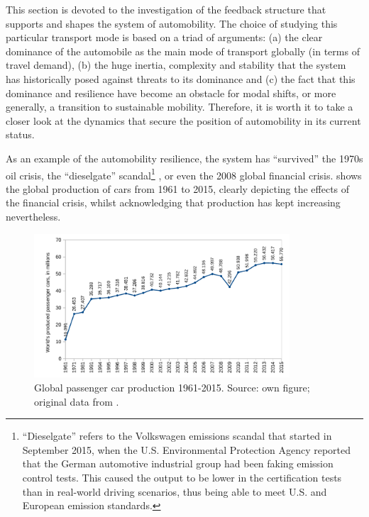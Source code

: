 This section is devoted to the investigation of the feedback structure that supports and shapes the system of automobility. The choice of studying this particular transport mode is based on a triad of arguments: (a) the clear dominance of the automobile as the main mode of transport globally (in terms of travel demand), (b) the huge inertia, complexity and stability that the system has historically posed against threats to its dominance and (c) the fact that this dominance and resilience have become an obstacle for modal shifts, or more generally, a transition to sustainable mobility. Therefore, it is worth it to take a closer look at the dynamics that secure the position of automobility in its current status.

As an example of the automobility resilience, the system has ``survived'' the 1970s oil crisis, the ``dieselgate'' scandal\footnote{``Dieselgate'' refers to the Volkswagen emissions scandal that started in September 2015, when the U.S. Environmental Protection Agency reported that the German automotive industrial group had been faking emission control tests. This caused the  output to be lower in the certification tests than in real-world driving scenarios, thus being able to meet U.S. and European emission standards.} \parencite{guardian2017_Volkswagenrevealsrecord}, or even the 2008 global financial crisis.  shows the global production of cars from 1961 to 2015, clearly depicting the effects of the financial crisis, whilst acknowledging that production has kept increasing nevertheless.
%
\begin{figure}[h]
\centering
\includegraphics[width=0.85\textwidth]{figures/line_global-car-sales.pdf}
\caption[Global passenger cars production 1961-2015.]{Global passenger car production 1961-2015. Source: own figure; original data from \textcite{bts2017_Table123}.}
\label{f:results:global-passenger-car-production}
\end{figure}

